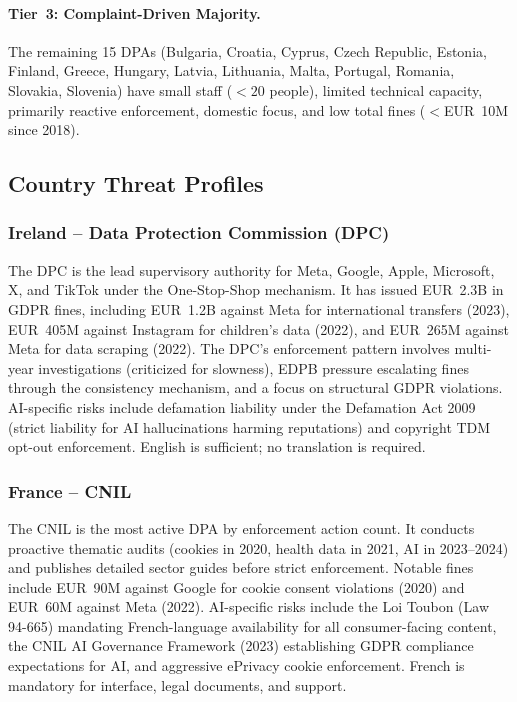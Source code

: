 \documentclass[11pt,a4paper]{article}
\begin{document}
\paragraph{Tier~3: Complaint-Driven Majority.}
The remaining 15 DPAs (Bulgaria, Croatia, Cyprus, Czech Republic, Estonia, Finland, Greece, Hungary, Latvia, Lithuania, Malta, Portugal, Romania, Slovakia, Slovenia) have small staff ($<20$ people), limited technical capacity, primarily reactive enforcement, domestic focus, and low total fines ($<$EUR~10M since 2018).

\subsection{Country Threat Profiles}

\subsubsection{Ireland -- Data Protection Commission (DPC)}

The DPC is the lead supervisory authority for Meta, Google, Apple, Microsoft, X, and TikTok under the One-Stop-Shop mechanism. It has issued EUR~2.3B in GDPR fines, including EUR~1.2B against Meta for international transfers (2023), EUR~405M against Instagram for children's data (2022), and EUR~265M against Meta for data scraping (2022). The DPC's enforcement pattern involves multi-year investigations (criticized for slowness), EDPB pressure escalating fines through the consistency mechanism, and a focus on structural GDPR violations. AI-specific risks include defamation liability under the Defamation Act 2009 (strict liability for AI hallucinations harming reputations) and copyright TDM opt-out enforcement. English is sufficient; no translation is required.

\subsubsection{France -- CNIL}

The CNIL is the most active DPA by enforcement action count. It conducts proactive thematic audits (cookies in 2020, health data in 2021, AI in 2023--2024) and publishes detailed sector guides before strict enforcement. Notable fines include EUR~90M against Google for cookie consent violations (2020) and EUR~60M against Meta (2022). AI-specific risks include the Loi Toubon (Law 94-665) mandating French-language availability for all consumer-facing content, the CNIL AI Governance Framework (2023) establishing GDPR compliance expectations for AI, and aggressive ePrivacy cookie enforcement. French is mandatory for interface, legal documents, and support.
\end{document}
